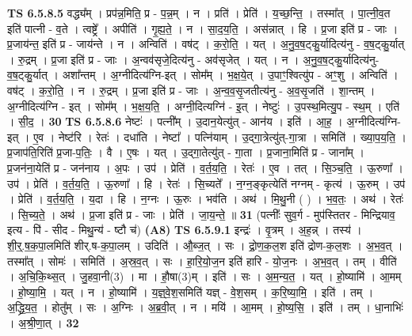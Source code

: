 \documentclass[17pt]{extarticle}
\begin{document}
                  \newline
                                \textbf{ TS 6.5.8.5} \newline
                  वद्ध्य᳚म् । प्रप॑न्न॒मिति॒ प्र - प॒न्न॒म् । न । प्रति॑ । प्रेति॑ । य॒च्छ॒न्ति॒ । तस्मा᳚त् । पा॒त्नी॒व॒त इति॑ पात्नी - व॒ते । त्वष्ट्रे᳚ । अपीति॑ । गृ॒ह्य॒ते॒ । न । सा॒द॒य॒ति॒ । अस॑न्नात् । हि । प्र॒जा इति॑ प्र - जाः । प्र॒जाय॑न्त॒ इति॑ प्र - जाय॑न्ते । न । अन्विति॑ । वष॑ट् । क॒रो॒ति॒ । यत् । अ॒नु॒व॒ष॒ट्कु॒र्यादित्य॑नु - व॒ष॒ट्कु॒र्यात् । रु॒द्रम् । प्र॒जा इति॑ प्र - जाः । अ॒न्वव॑सृजे॒दित्य॑नु - अव॑सृजेत् । यत् । न । अ॒नु॒व॒ष॒ट्कु॒र्यादित्य॑नु-व॒ष॒ट्कु॒र्यात् । अशा᳚न्तम् । अ॒ग्नीदित्य॑ग्नि-इत् । सोम᳚म् । भ॒क्ष॒ये॒त् ।  उ॒पाꣳ॒॒श्वित्यु॑प - अꣳ॒॒शु । अन्विति॑ । वष॑ट् । क॒रो॒ति॒ । न । रु॒द्रम् । प्र॒जा इति॑ प्र - जाः । अ॒न्व॒व॒सृ॒जतीत्य॑नु - अ॒व॒सृ॒जति॑ । शा॒न्तम् । अ॒ग्नीदित्य॑ग्नि - इत् । सोम᳚म् । भ॒क्ष॒य॒ति॒ । अग्नी॒दित्यग्नि॑ - इ॒त् । नेष्टुः॑ । उ॒पस्थ॒मित्यु॒प - स्थ॒म् । एति॑ । सी॒द॒ । \textbf{  30} \newline
                  \newline
                                \textbf{ TS 6.5.8.6} \newline
                  नेष्टः॑ । पत्नी᳚म् । उ॒दान॒येत्यु॑त् - आन॑य । इति॑ । आ॒ह॒ । अ॒ग्नीदित्य॑ग्नि-इत् । ए॒व । नेष्ट॑रि । रेतः॑ । दधा॑ति । नेष्टा᳚ । पत्नि॑याम् । उ॒द्गा॒त्रेत्यु॑त्-गा॒त्रा । समिति॑ । ख्या॒प॒य॒ति॒ । प्र॒जाप॑ति॒रिति॑ प्र॒जा-प॒तिः॒ । वै । ए॒षः । यत् । उ॒द्गा॒तेत्यु॑त् - गा॒ता । प्र॒जाना॒मिति॑ प्र - जाना᳚म् । प्र॒जन॑ना॒येति॑ प्र - जन॑नाय । अ॒पः । उप॑ । प्रेति॑ । व॒र्त॒य॒ति॒ । रेतः॑ । ए॒व । तत् । सि॒ञ्च॒ति॒ । ऊ॒रुणा᳚ । उप॑ । प्रेति॑ । व॒र्त॒य॒ति॒ । ऊ॒रुणा᳚ । हि । रेतः॑ । सि॒च्यते᳚ । न॒ग्न॒ङ्कृत्येति॑ नग्नम् - कृत्य॑ । ऊ॒रुम् । उप॑ । प्रेति॑ । व॒र्त॒य॒ति॒ । य॒दा । हि । न॒ग्नः । ऊ॒रुः । भव॑ति । अथ॑ । मि॒थु॒नी ( ) । भ॒व॒तः॒ । अथ॑ । रेतः॑ । सि॒च्य॒ते॒ । अथ॑ । प्र॒जा इति॑ प्र - जाः । प्रेति॑ । जा॒य॒न्ते॒ ॥ \textbf{  31} \newline
                  \newline
                      (पत्नीः᳚ सुव॒र्ग - मुप॑स्तितर - मिन्द्रियाव॒ इत्य - पि॑ - सीद - मिथु॒न्य॑ - ष्टौ च॑)  \textbf{(A8)} \newline \newline
                                \textbf{ TS 6.5.9.1} \newline
                  इन्द्रः॑ । वृ॒त्रम् । अ॒ह॒न्न् । तस्य॑ । शी॒र्॒.ष॒क॒पा॒लमिति॑ शीर्.ष-क॒पा॒लम् । उदिति॑ । औ॒ब्ज॒त् । सः । द्रो॒ण॒क॒ल॒श इति॑ द्रोण-क॒ल॒शः । अ॒भ॒व॒त् । तस्मा᳚त् । सोमः॑ । समिति॑ । अ॒स्र॒व॒त् । सः । हा॒रि॒यो॒ज॒न इति॑ हारि - यो॒ज॒नः । अ॒भ॒व॒त् । तम् । वीति॑ । अ॒चि॒कि॒थ्स॒त् । जु॒हवा॒नी(3) । मा । हौ॒षा(3)म् । इति॑ । सः । अ॒म॒न्य॒त॒ । यत् । हो॒ष्यामि॑ । आ॒मम् । हो॒ष्या॒मि॒ । यत् । न । हो॒ष्यामि॑ । य॒ज्ञ्॒वे॒श॒समिति॑ यज्ञ् - वे॒श॒सम् । क॒रि॒ष्या॒मि॒ । इति॑ । तम् । अ॒द्ध्रि॒य॒त॒ । होतु᳚म् । सः । अ॒ग्निः । अ॒ब्र॒वी॒त् । न । मयि॑ । आ॒मम् । हो॒ष्य॒सि॒ । इति॑ । तम् । धा॒नाभिः॑ । अ॒श्री॒णा॒त् । \textbf{  32} \newline
\end{document}
